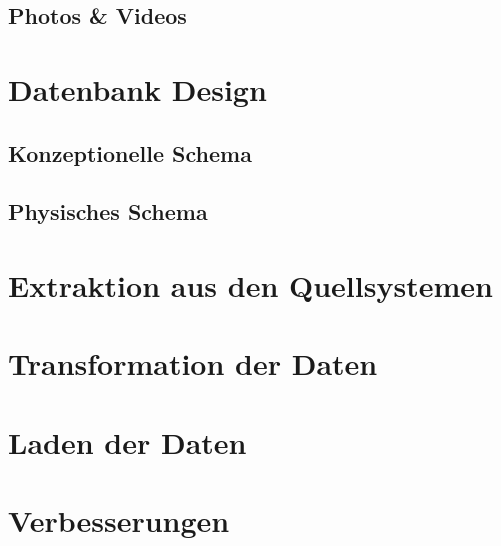\subsection{Photos \& Videos}
\section{Datenbank Design}
\subsection{Konzeptionelle Schema}
\subsection{Physisches Schema}
\section{Extraktion aus den Quellsystemen}
\section{Transformation der Daten}
\section{Laden der Daten}
\section{Verbesserungen}


